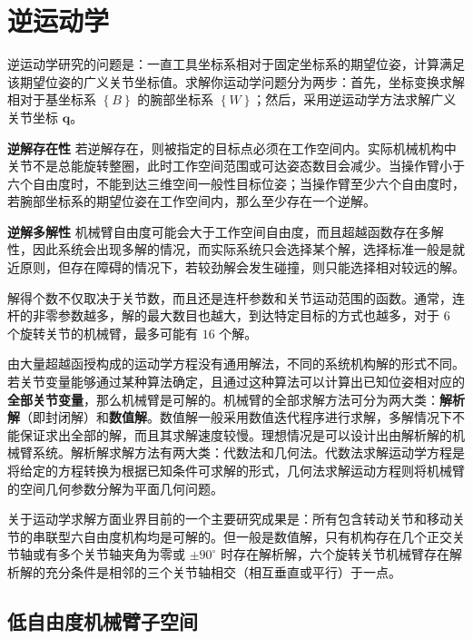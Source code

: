\documentclass[cn,11pt,chinese,blue,bibstyle=ieeetr]{elegantbook}
\begin{document}
\section{逆运动学}\label{inverse_kinematics}

逆运动学研究的问题是：一直工具坐标系相对于固定坐标系的期望位姿，计算满足该期望位姿的广义关节坐标值。求解你运动学问题分为两步：首先，坐标变换求解相对于基坐标系 $\left\{B\right\}$ 的腕部坐标系 $\left\{W\right\}$；然后，采用逆运动学方法求解广义关节坐标 $\bm{q}$。


\begin{property}{\textbf{逆解存在性}}
若逆解存在，则被指定的目标点必须在工作空间内。实际机械机构中关节不是总能旋转整圈，此时工作空间范围或可达姿态数目会减少。当操作臂小于六个自由度时，不能到达三维空间一般性目标位姿；当操作臂至少六个自由度时，若腕部坐标系的期望位姿在工作空间内，那么至少存在一个逆解。
\end{property}


\begin{property}{\textbf{逆解多解性}}
机械臂自由度可能会大于工作空间自由度，而且超越函数存在多解性，因此系统会出现多解的情况，而实际系统只会选择某个解，选择标准一般是就近原则，但存在障碍的情况下，若较劲解会发生碰撞，则只能选择相对较远的解。

解得个数不仅取决于关节数，而且还是连杆参数和关节运动范围的函数。通常，连杆的非零参数越多，解的最大数目也越大，到达特定目标的方式也越多，对于 $6$ 个旋转关节的机械臂，最多可能有 $16$ 个解。
\end{property}

由大量超越函授构成的运动学方程没有通用解法，不同的系统机构解的形式不同。若关节变量能够通过某种算法确定，且通过这种算法可以计算出已知位姿相对应的\textbf{全部关节变量}，那么机械臂是可解的。机械臂的全部求解方法可分为两大类：\textbf{解析解}（即封闭解）和\textbf{数值解}。数值解一般采用数值迭代程序进行求解，多解情况下不能保证求出全部的解，而且其求解速度较慢。理想情况是可以设计出由解析解的机械臂系统。解析解求解方法有两大类：代数法和几何法。代数法求解运动学方程是将给定的方程转换为根据已知条件可求解的形式，几何法求解运动方程则将机械臂的空间几何参数分解为平面几何问题。


关于运动学求解方面业界目前的一个主要研究成果是：所有包含转动关节和移动关节的串联型六自由度机构均是可解的。但一般是数值解，只有机构存在几个正交关节轴或有多个关节轴夹角为零或 $\pm 90^{\circ}$ 时存在解析解，六个旋转关节机械臂存在解析解的充分条件是相邻的三个关节轴相交（相互垂直或平行）于一点。


\subsection{低自由度机械臂子空间}
\end{document}
